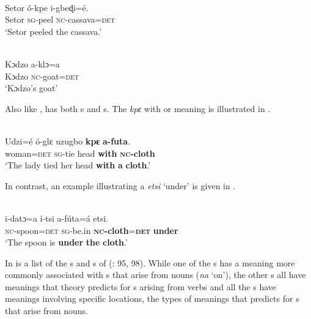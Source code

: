 \documentclass[output=paper]{langsci/langscibook}
\begin{document}
\ea\label{ex:dryer:17}
\\
\gll Setor  ó-kpe  i-gbeɖi=é.\\
       Setor  \textsc{sg}{}-peel  \textsc{nc}{}-cassava=\textsc{det}\\
\glt   ‘Setor peeled the cassava.’ 
\z

\ea\label{ex:dryer:18}
\\
\gll Kɔdzo    a-klɔ=a\\
       Kɔdzo    \textsc{nc}{}-goat=\textsc{det}\\
\glt   ‘Kɔdzo’s goat’ 
\z

\noindent Also like ,  has both s and s. The  \textit{kpɛ} with  or  meaning is illustrated in .

\ea\label{ex:dryer:19}
\\
\gll Udzi=é  ó-glɛ  uzugbo  \textbf{kpɛ}  \textbf{a-futa}.\\
       woman=\textsc{det}  \textsc{sg}{}-tie  head  \textbf{with}  \textbf{\textsc{nc}}\textbf{{}-cloth}  \\
\glt ‘The lady tied her head \textbf{with} \textbf{a} \textbf{cloth}.’  
\z

\noindent In contrast, an example illustrating a  \textit{etsi} ‘under’ is given in .

\ea\label{ex:dryer:20}
\\
\gll i-datɔ=a  í-tsi  a-fúta=á  etsi.\\
       \textsc{nc}{}-spoon=\textsc{det}  \textsc{sg}{}-be.in  \textbf{\textsc{nc-}}\textbf{cloth}=\textbf{\textsc{det}}  \textbf{under}\\
\glt   ‘The spoon is \textbf{under} \textbf{the} \textbf{cloth}.’ 
\z

In  is a list of the s and s of  (\citealt{Dorvlo2008}: 95, 98). While one of the s has a meaning more commonly associated with s that arise from nouns (\textit{na} ‘on’), the other s all have meanings that  theory predicts for s arising from verbs and all the s have meanings involving specific locations, the types of meanings that  predicts for s that arise from nouns.
\end{document}
